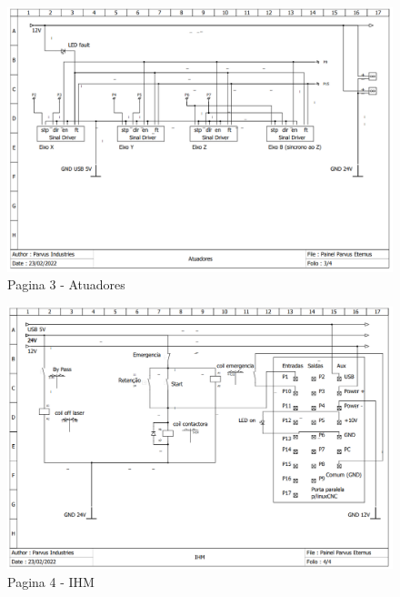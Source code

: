\documentclass[
	article,			%
	11pt,				%
	oneside,			%
	a4paper,			%
	section=TITLE,		%
	english,			%
	brazil,				%
	sumario=tradicional
	]{abntex2}
\begin{document}
\begin{landscape}
\begin{figure}[H]
    \centering
    \includegraphics[height=1\textwidth]{img/p3 driv.PNG}
    \caption{Pagina 3 - Atuadores}
    \label{fig:p3}
\end{figure}

\begin{figure}[H]
    \centering
    \includegraphics[height=1\textwidth]{img/p4 plac.PNG}
    \caption{Pagina 4 - IHM}
    \label{fig:p4}
\end{figure}
\end{landscape}
\end{document}
